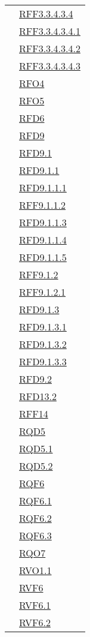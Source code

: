 \begin{longtable}{|>{\centering}m{5cm}|m{5cm}<{\centering}|}
& \hyperlink{RFF3.3.4.3.4}{RFF3.3.4.3.4}\\
& \hyperlink{RFF3.3.4.3.4.1}{RFF3.3.4.3.4.1}\\
& \hyperlink{RFF3.3.4.3.4.2}{RFF3.3.4.3.4.2}\\
& \hyperlink{RFF3.3.4.3.4.3}{RFF3.3.4.3.4.3}\\
& \hyperlink{RFO4}{RFO4}\\
& \hyperlink{RFO5}{RFO5}\\
& \hyperlink{RFD6}{RFD6}\\
& \hyperlink{RFD9}{RFD9}\\
& \hyperlink{RFD9.1}{RFD9.1}\\
& \hyperlink{RFD9.1.1}{RFD9.1.1}\\
& \hyperlink{RFD9.1.1.1}{RFD9.1.1.1}\\
& \hyperlink{RFF9.1.1.2}{RFF9.1.1.2}\\
& \hyperlink{RFD9.1.1.3}{RFD9.1.1.3}\\
& \hyperlink{RFD9.1.1.4}{RFD9.1.1.4}\\
& \hyperlink{RFD9.1.1.5}{RFD9.1.1.5}\\
& \hyperlink{RFF9.1.2}{RFF9.1.2}\\
& \hyperlink{RFF9.1.2.1}{RFF9.1.2.1}\\
& \hyperlink{RFD9.1.3}{RFD9.1.3}\\
& \hyperlink{RFD9.1.3.1}{RFD9.1.3.1}\\
& \hyperlink{RFD9.1.3.2}{RFD9.1.3.2}\\
& \hyperlink{RFD9.1.3.3}{RFD9.1.3.3}\\
& \hyperlink{RFD9.2}{RFD9.2}\\
& \hyperlink{RFD13.2}{RFD13.2}\\
& \hyperlink{RFF14}{RFF14}\\
& \hyperlink{RQD5}{RQD5}\\
& \hyperlink{RQD5.1}{RQD5.1}\\
& \hyperlink{RQD5.2}{RQD5.2}\\
& \hyperlink{RQF6}{RQF6}\\
& \hyperlink{RQF6.1}{RQF6.1}\\
& \hyperlink{RQF6.2}{RQF6.2}\\
& \hyperlink{RQF6.3}{RQF6.3}\\
& \hyperlink{RQO7}{RQO7}\\
& \hyperlink{RVO1.1}{RVO1.1}\\
& \hyperlink{RVF6}{RVF6}\\
& \hyperlink{RVF6.1}{RVF6.1}\\
& \hyperlink{RVF6.2}{RVF6.2}\\

\end{longtable}
